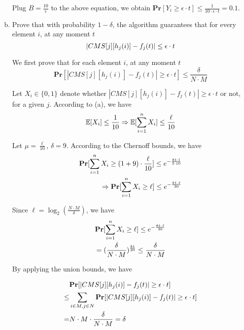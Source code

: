 \begin{problem}[40 points]
\begin{enumerate}[(a)]
        Plug $B=\frac{10}{\epsilon}$ to the above equation, we obtain $\mathbf{Pr}[Y_i \geq \epsilon \cdot t] \leq \frac{1}{10 \cdot \epsilon \cdot t}=0.1$.

        \item Prove that with probability $1 - \delta$, the algorithm guarantees that for every element $i$, at any moment $t$
        \begin{equation}
            \notag |CMS[j][h_j(i)]-f_j(t)| \le \epsilon \cdot t
        \end{equation}

        \Answer
        We first prove that for each element $i$, at any moment $t$
        \begin{equation}
            \mathbf{Pr}[|CMS[j][h_j(i)]-f_j(t)| \geq \epsilon \cdot t] \leq \frac{\delta}{N \cdot M}    
        \end{equation}
        
        Let $X_i \in \{0,1\}$ denote whether $|CMS[j][h_j(i)]-f_j(t)| \geq \epsilon \cdot t$ or not, for a given $j$. According to (a), we have
        \begin{equation}
            \operatorname*{\mathbb{E}}[X_i]\leq \frac{1}{10} \Rightarrow \operatorname*{\mathbb{E}}[\sum_{i=1}^n X_i] \leq \frac{\ell}{10}
        \end{equation}

        Let $\mu=\frac{\ell}{10}$, $\delta=9$. According to the Chernoff bounds, we have
        \begin{align}
            \mathbf{Pr}[\sum_{i=1}^n X_i \geq (1+9) \cdot \frac{\ell}{10}] \leq e^{-\frac{81\cdot l}{3 \cdot 10}} \notag \\
            \Rightarrow \mathbf{Pr}[\sum_{i=1}^n X_i \geq \ell] \leq e^{-\frac{81 \cdot \ell}{30}}
        \end{align}

        Since $\ell = \log_{2}(\frac{N\cdot M}{\delta})$, we have
        \begin{align}
            \mathbf{Pr}[\sum_{i=1}^n X_i \geq \ell] \leq e^{-\frac{81 \cdot \ell}{30}} \notag \\
            =(\frac{\delta}{N \cdot M})^{\frac{81}{30}} \leq \frac{\delta}{N \cdot M}
        \end{align}

        By applying the union bounds, we have

        \begin{align}
            &\mathbf{Pr}[|CMS[j][h_j(i)]-f_j(t)| \ge \epsilon \cdot t] \notag \\
            \leq &\sum_{i \in M, j \in N}\mathbf{Pr}[|CMS[j][h_j(i)]-f_j(t)| \ge \epsilon \cdot t] \notag \\
            =&N \cdot M \cdot \frac{\delta}{N \cdot M} = \delta 
        \end{align}


\end{enumerate}
\end{problem}
